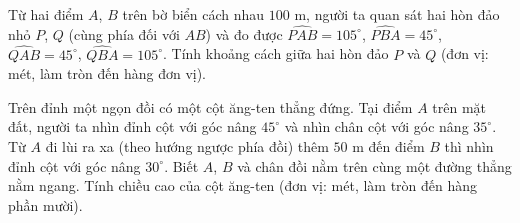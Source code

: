 \begin{bt}%
	Từ hai điểm $A$, $B$ trên bờ biển cách nhau $100\text{ m}$, người ta quan sát hai hòn đảo nhỏ $P$, $Q$ (cùng phía đối với $AB$) và đo được $\widehat{PAB}=105^\circ$, $\widehat{PBA}=45^\circ$, $\widehat{QAB}=45^\circ$, $\widehat{QBA}=105^\circ$. Tính khoảng cách giữa hai hòn đảo $P$ và $Q$ (đơn vị: mét, làm tròn đến hàng đơn vị).
\end{bt}

\begin{bt}%
	Trên đỉnh một ngọn đồi có một cột ăng-ten thẳng đứng. Tại điểm $A$ trên mặt đất, người ta nhìn đỉnh cột với góc nâng $45^\circ$ và nhìn chân cột với góc nâng $35^\circ$. Từ $A$ đi lùi ra xa (theo hướng ngược phía đồi) thêm $50\text{ m}$ đến điểm $B$ thì nhìn đỉnh cột với góc nâng $30^\circ$. Biết $A$, $B$ và chân đồi nằm trên cùng một đường thẳng nằm ngang. Tính chiều cao của cột ăng-ten (đơn vị: mét, làm tròn đến hàng phần mười).
\end{bt}

